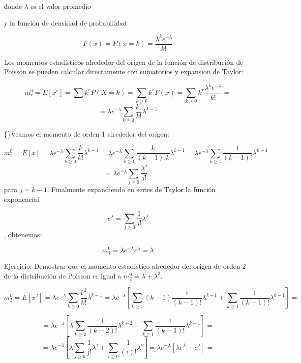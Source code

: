 \documentclass[
]{agujournal2019}
\begin{document}
donde \(\lambda\) es el valor promedio

\begin{center}
\end{center}

y la función de densidad de probabilidad

\[F(x)=P(x=k)=\frac{{\lambda}^k e^{-\lambda}}{k!}\]

\begin{center}
\end{center}

Los momentos estadísticos alrededor del origen de la función de
distribución de Poisson se pueden calcular directamente con sumatorios y
expansion de Taylor:

\[m^0_r=E[x^r]=\sum k^r P(X=k)=\sum_{k\ge0} k^rF(x)= \sum_{k\ge0} k^r\frac{{\lambda}^k e^{-\lambda}}{k!}=\]
\[=\lambda e^{-\lambda}\sum_{k \ge 0}\frac{k^r}{k!}\lambda^{k-1}\]

\{\noindent\}Veamos el momento de orden 1 alrededor del orígen:

\[m^0_1=E[x]=\lambda e^{-\lambda}\sum_{k \ge 0}\frac{k}{k!}\lambda^{k-1}=
 \lambda e^{-\lambda}\sum_{k \ge 1}\frac{k}{(k-1)!k}\lambda^{k-1}=
 \lambda e^{-\lambda}\sum_{k \ge 1}\frac{1}{(k-1)!}\lambda^{k-1}\]
\[=\lambda e^{-\lambda}\sum_{j \ge 0}\frac{\lambda^{j}}{j!}\,,\] para
\(j=k-1\). Finalmente expandiendo en series de Taylor la función
exponencial

\[e^{\lambda}=\sum_{j \ge 0}\frac{1}{j!}\lambda^{j}\], obtenemos:

\[m^0_1=\lambda e^{-\lambda}e^{\lambda}=\lambda\]

Ejercicio: Demostrar que el momento estadístico alrededor del origen de
orden 2 de la distribución de Poisson es igual a
\(m^0_2=\lambda+\lambda^2\).

\[m^0_2=E[x^2]=\lambda e^{-\lambda}\sum_{k \ge 0}\frac{k^2}{k!}\lambda^{k-1}=
               \lambda e^{-\lambda}\left[ \sum_{k \ge 1}(k-1)\frac{1}{(k-1)!}\lambda^{k-1} +
                                      \sum_{k \ge 1} \frac{1} {(k-1)!} \lambda^{k-1} \right]=\]

\[= \lambda e^{-\lambda}\left[ \lambda \sum_{k \ge 2}\frac{1}{(k-2)!}\lambda^{k-2} + \sum_{k \ge 1}\frac{1}{(k-1)!}\lambda^{k-1}\right]=\]
\[= \lambda e^{-\lambda}\left[ \lambda \sum_{j \ge 0}\frac{1}{j!}\lambda^{j} + \sum_{i \ge 0}\frac{1}{(i)!}\lambda^{i}\right]=
\lambda e^{-\lambda} \left[\lambda e^{\lambda} + e^{\lambda}\right]=\]
\end{document}

